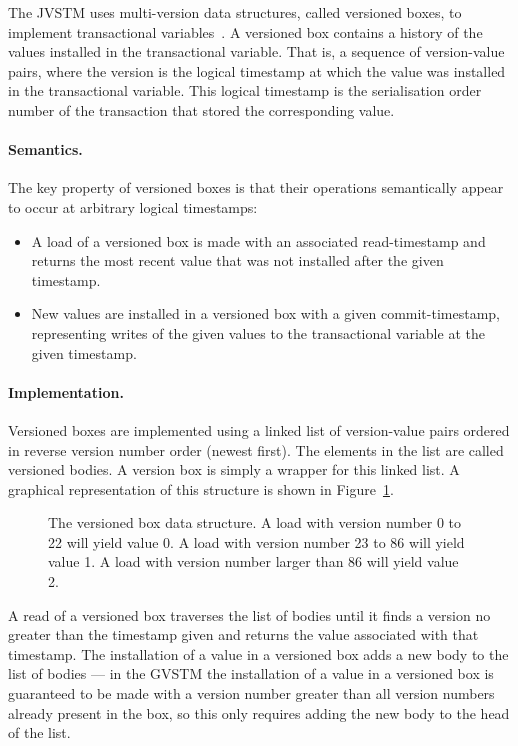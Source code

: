 \documentclass[12pt,a4paper,oneside,openright]{report}
\newcommand{\mycaption}[2]{\caption[#1]{#1 #2}}
\begin{document}
The JVSTM uses multi-version data structures, called versioned boxes,
to implement transactional variables~\cite{VBox}. A versioned box
contains a history of the values installed in the transactional
variable. That is, a sequence of version-value pairs, where the
version is the logical timestamp at which the value was installed in
the transactional variable. This logical timestamp is the
serialisation order number of the transaction that stored the
corresponding value.

\paragraph{Semantics.} The key property of versioned boxes is that
their operations semantically appear to occur at arbitrary logical
timestamps:
\begin{itemize}
\item A load of a versioned box is made with an associated
  read-timestamp and returns the most recent value that was not
  installed after the given timestamp.
\item New values are installed in a versioned box with a given
  commit-timestamp, representing writes of the given values to the
  transactional variable at the given timestamp.
\end{itemize}

\paragraph{Implementation.} Versioned boxes are implemented using a
linked list of version-value pairs ordered in reverse version number
order (newest first). The elements in the list are called versioned
bodies. A version box is simply a wrapper for this linked list. A
graphical representation of this structure is shown in
Figure~\ref{fig:box-and-bodies}.

\begin{figure}[hb]
  \centering
  \mycaption{The versioned box data structure.}{A load with version
    number 0 to 22 will yield value 0. A load with version number 23
    to 86 will yield value 1. A load with version number larger than
    86 will yield value 2.}
  \label{fig:box-and-bodies}
\end{figure}
A read of a versioned box traverses the list of bodies until it finds
a version no greater than the timestamp given and returns the value
associated with that timestamp. The installation of a value in a
versioned box adds a new body to the list of bodies --- in the GVSTM
the installation of a value in a versioned box is guaranteed to be
made with a version number greater than all version numbers already
present in the box, so this only requires adding the new body to the
head of the list.
\end{document}

